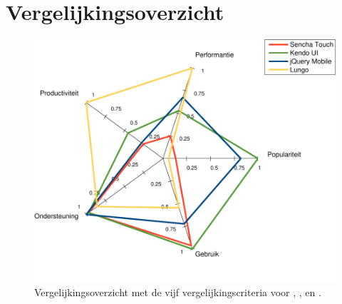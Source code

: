 \section{Vergelijkingsoverzicht}
\label{sec:evaluatie-spinnenweb}

\begin{figure}[H]
  \centering
  \includegraphics[width=\textwidth]{figuren/spidergraph.pdf}
  \caption{Vergelijkingsoverzicht met de vijf vergelijkingscriteria voor \st{},  \kendo{},  \jqm{} en \lungo{}.}
  \label{fig:spinnenweb}
\end{figure}